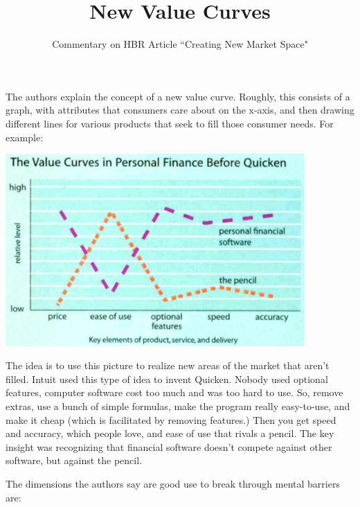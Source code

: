 \documentclass[11pt, oneside]{article}   	%
\title{New Value Curves}
\author{Commentary on HBR Article ``Creating New Market Space"}
\begin{document}
\maketitle

The authors explain the concept of a new value curve.  Roughly, this consists of a graph, with attributes that consumers care about on the x-axis, and then drawing different lines for various products that seek to fill those consumer needs.  For example:

\begin{center}
\includegraphics[width=4.5in]{curve.png}
\end{center}

The idea is to use this picture to realize new areas of the market that aren't filled.  Intuit used this type of idea to invent Quicken.  Nobody used optional features, computer software cost too much and was too hard to use.  So, remove extras, use a bunch of simple formulas, make the program really easy-to-use, and make it cheap (which is facilitated by removing features.)  Then you get speed and accuracy, which people love, and ease of use that rivals a pencil.  The key insight was recognizing that financial software doesn't compete against other software, but against the pencil.

The dimensions the authors say are good use to break through mental barriers are:
\end{document}
